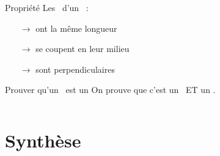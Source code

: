 \documentclass{beamer}
\begin{document}
\begin{frame}
	\frametitle{}  
	\framesubtitle{}
	
	\begin{columns}[onlytextwidth]	
		\begin{column}{0.65\textwidth}
			
			\begin{alertblock}{Propriété }
				Les \diags\ d'un \car\ :
				\begin{itemize}
					\item[$\rightarrow$] ont la même longueur
					\item[$\rightarrow$] se coupent en leur milieu
					\item[$\rightarrow$] sont perpendiculaires
				\end{itemize}
			\end{alertblock}
			
			\begin{alertblock}{Prouver qu'un \myquad\ est un \car }
				On prouve que c'est un \los\ ET un \rect .
			\end{alertblock}
			
		\end{column}
		\begin{column}{0.35\textwidth}
		\end{column}	
	\end{columns}
\end{frame}

\section{Synthèse}

\begin{frame}
	\frametitle{}
\end{frame}

\begin{frame}
	\frametitle{}  
	\framesubtitle{}	
	
\end{frame}
\end{document}
